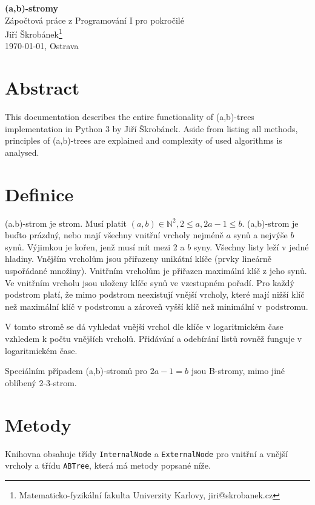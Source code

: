 \documentclass[a4paper,11pt,openany]{article}
\begin{document}
\begin{center}
{\huge \textbf{(a,b)-stromy}}\\\vspace{\baselineskip}Zápočtová práce z Programování I pro pokročilé\\
\vspace{10mm} {\large Jiří Škrobánek\footnote[1]{Matematicko-fyzikální fakulta Univerzity Karlovy, {\ttfamily jiri@skrobanek.cz}}}\\
\vspace{10mm}\today, Ostrava
\end{center}
	
\section*{Abstract}
	
This documentation describes the entire functionality of (a,b)-trees implementation in Python 3 by Jiří Škrobánek. Aside from listing all methods, principles of (a,b)-trees are explained and complexity of used algorithms is analysed.
	
\tableofcontents
	
\section{Definice}
(a.b)-strom je strom. Musí platit $(a,b) \in \mathbb{N}^2, 2 \leq a, 2a - 1 \leq b $. (a,b)-strom je buďto prázdný, nebo mají všechny vnitřní vrcholy nejméně $a$ synů a nejvýše $b$ synů. Výjimkou je kořen, jenž musí mít mezi 2 a $b$ syny. Všechny listy leží v jedné hladiny. Vnějším vrcholům jsou přiřazeny unikátní klíče (prvky lineárně uspořádané množiny). Vnitřním vrcholům je přiřazen maximální klíč z jeho synů. Ve vnitřním vrcholu jsou uloženy klíče synů ve vzestupném pořadí. Pro každý podstrom platí, že mimo podstrom neexistují vnější vrcholy, které mají nižší klíč než maximální klíč v podstromu a zároveň vyšší klíč než minimální v~podstromu.
	
V tomto stromě se dá vyhledat vnější vrchol dle klíče v logaritmickém čase vzhledem k počtu vnějších vrcholů. Přidávání a odebírání listů rovněž funguje v logaritmickém čase.
	
Speciálním případem (a,b)-stromů pro $2a-1=b$ jsou B-stromy, mimo jiné oblíbený 2-3-strom.
	
\section{Metody}
Knihovna obsahuje třídy \texttt{InternalNode} a \texttt{ExternalNode} pro vnitřní a vnější vrcholy a třídu \texttt{ABTree}, která má metody popsané níže.
	
\end{document}
